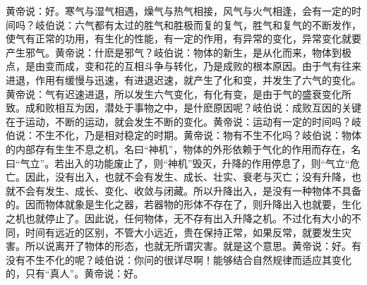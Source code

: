 \documentclass[a4paper,12pt,UTF8,twoside]{ctexbook}
\begin{document}
黄帝说：好。寒气与湿气相遇，燥气与热气相接，风气与火气相逢，会有一定的时间吗？岐伯说：六气都有太过的胜气和胜极而复的复气，胜气和复气的不断发作，使气有正常的功用，有生化的性能，有一定的作用，有异常的变化，异常变化就要产生邪气。黄帝说：什麽是邪气？岐伯说：物体的新生，是从化而来，物体到极点，是由变而成，变和花的互相斗争与转化，乃是成败的根本原因。由于气有往来进退，作用有缓慢与迅速，有进退迟速，就产生了化和变，并发生了六气的变化。黄帝说：气有迟速进退，所以发生六气变化，有化有变，是由于气的盛衰变化所致。成和败相互为因，潜处于事物之中，是什麽原因呢？岐伯说：成败互因的关键在于运动，不断的运动，就会发生不断的变化。黄帝说：运动有一定的时间吗？岐伯说：不生不化，乃是相对稳定的时期。黄帝说：物有不生不化吗？岐伯说：物体的内部存有生生不息之机，名曰“神机”，物体的外形依赖于气化的作用而存在，名曰“气立”。若出入的功能废止了，则“神机”毁灭，升降的作用停息了，则“气立“危亡。因此，没有出入，也就不会有发生、成长、壮实、衰老与灭亡；没有升降，也就不会有发生、成长、变化、收敛与闭藏。所以升降出入，是没有一种物体不具备的。因而物体就象是生化之器，若器物的形体不存在了，则升降出入也就要，生化之机也就停止了。因此说，任何物体，无不存有出入升降之机。不过化有大小的不同，时间有远近的区别，不管大小远近，贵在保持正常，如果反常，就要发生灾害。所以说离开了物体的形态，也就无所谓灾害。就是这个意思。黄帝说：好。有没有不生不化的呢？岐伯说：你问的很详尽啊！能够结合自然规律而适应其变化的，只有“真人”。黄帝说：好。

\part{}
\end{document}
